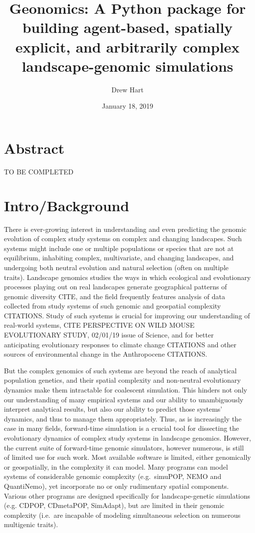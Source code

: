 ﻿\documentclass{article}
\title{Geonomics: A Python package for building agent-based, spatially explicit, and arbitrarily complex landscape-genomic simulations}
\author{Drew Hart}
\date{January 18, 2019}
\begin{document}
\maketitle

\section{Abstract}

{\LARGE TO BE COMPLETED}

\section{Intro/Background}
There is ever-growing interest in understanding and even predicting
the genomic evolution of complex study systems on complex and changing landscapes.
Such systems might include one or multiple populations or species that are not
at equilibrium, inhabiting complex, multivariate, and changing landscapes, and 
undergoing both neutral evolution and natural selection (often on multiple traits).
Landscape genomics studies the ways in which ecological and evolutionary processes playing
out on real landscapes generate geographical patterns of genomic diversity {\large CITE},
and the field frequently features analysis of data collected from study systems of such
genomic and geospatial complexity {\large CITATIONS}.
Study of such systems is crucial for improving our understanding of real-world systems, 
{\large CITE PERSPECTIVE ON WILD MOUSE EVOLUTIONARY STUDY, 02/01/19 issue of Science},
and for better anticipating evolutionary responses to climate change {\large CITATIONS}
and other sources of environmental change in the Anthropocene {\large CITATIONS}.

But the complex genomics of such systems are beyond the reach of analytical
population genetics, and their spatial complexity and non-neutral evolutionary
dynamics make them intractable for coalescent simulation.
This hinders not only our understanding of many empirical systems and our ability to
unambiguously interpret analytical results, but also our
ability to predict those systems' dynamics, and thus to manage them appropriately.
Thus, as is increasingly the case in many fields, forward-time simulation is a 
crucial tool for dissecting the evolutionary dynamics of complex study systems in landscape genomics.
However, the current suite of forward-time genomic simulators, however numerous, is still of limited use for such work.
Most available software is limited, either genomically or geospatially, in the complexity it can model.
Many programs can model systems of considerable genomic complexity (e.g.\ simuPOP, NEMO and QuantiNemo),
yet incorporate no or only rudimentary spatial components.
Various other programs are designed specifically for landscape-genetic simulations (e.g. CDPOP,
CDmetaPOP, SimAdapt), but are limited in their genomic complexity (i.e.\ are incapable of
modeling simultaneous selection on numerous multigenic traits).
\end{document}
